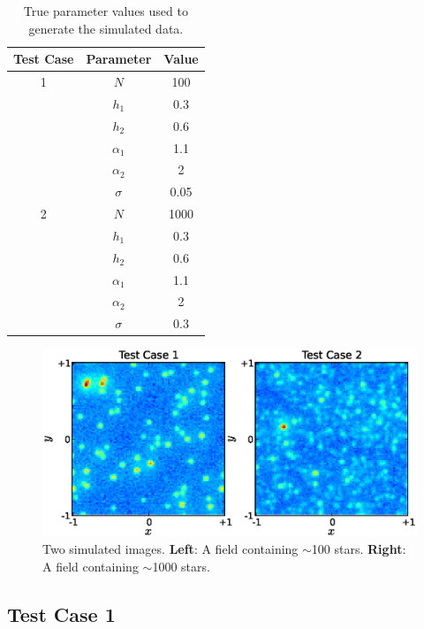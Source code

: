 \documentclass[manuscript]{aastex}
\begin{document}
\begin{table}
\begin{center}
\begin{tabular}{|c|c|c|}
\hline
Test Case & Parameter & Value \\
\hline
1 & $N$ & 100\\
  & $h_1$ & 0.3\\
  & $h_2$ & 0.6\\
  & $\alpha_1$ & 1.1\\
  & $\alpha_2$ & 2\\
  & $\sigma$ & 0.05\\
\hline
2 & $N$ & 1000\\
  & $h_1$ & 0.3\\
  & $h_2$ & 0.6\\
  & $\alpha_1$ & 1.1\\
  & $\alpha_2$ & 2\\
  & $\sigma$ & 0.3\\
\hline
\end{tabular}
\end{center}
\caption{True parameter values used to generate the simulated data.
\label{tab:truth}}
\end{table}

\begin{figure}
\begin{center}
\includegraphics[scale=0.7]{Figures/test_cases.eps}
\caption{Two simulated images.
{\bf Left}: A field containing $\sim$100 stars.
{\bf Right}: A field containing $\sim$1000 stars.\label{fig:simulated_data}}
\end{center}
\end{figure}

\subsection{Test Case 1}
\end{document}

